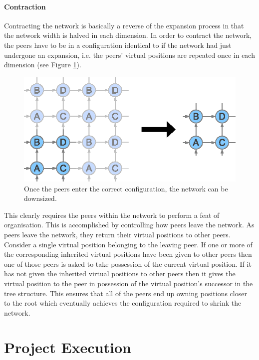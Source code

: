 \documentclass[ %
                    author={Luke Murray},
                supervisor={Dr. Simon Hollis},
                     title={Shadow Peer-to-Peer Networks},
                  subtitle={},
                    degree={MEng},
                      year={2013} ]{thesis}
\begin{document}
\subsubsection{Contraction}

Contracting the network is basically a reverse of the expansion process in that the network width is halved in each dimension. In order to contract the network, the peers have to be in a configuration identical to if the network had just undergone an expansion, i.e. the peers' virtual positions are repeated once in each dimension (see Figure \ref{contraction}).

\begin{figure}[h]
    \centering
    \includegraphics{diagrams/network_contraction.eps}
    \caption{Once the peers enter the correct configuration, the network can be downsized.}
    \label{contraction}
\end{figure}

This clearly requires the peers within the network to perform a feat of organisation. This is accomplished by controlling how peers leave the network. As peers leave the network, they return their virtual positions to other peers. Consider a single virtual position belonging to the leaving peer. If one or more of the corresponding inherited virtual positions have been given to other peers then one of those peers is asked to take possession of the current virtual position. If it has not given the inherited virtual positions to other peers then it gives the virtual position to the peer in possession of the virtual position's successor in the tree structure. This ensures that all of the peers end up owning positions closer to the root which eventually achieves the configuration required to shrink the network.


\chapter{Project Execution}
\label{chap:execution}
\end{document}
